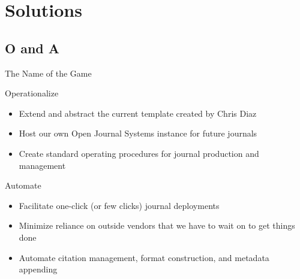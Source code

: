 \documentclass[aspectratio=169,9pt,xcolor=dvipsnames]{beamer}
\begin{document}
\section{Solutions}
\subsection{O and A}
\begin{frame}{The Name of the Game}
    \begin{block}{Operationalize}
        \begin{itemize}
            \item Extend and abstract the current template created by Chris Diaz
            \item Host our own Open Journal Systems instance for future journals
            \item Create standard operating procedures for journal production and management
        \end{itemize}
    \end{block} %
    \begin{block}{Automate}
        \begin{itemize}
            \item Facilitate one-click (or few clicks) journal deployments
            \item Minimize reliance on outside vendors that we have to wait on to get things done
            \item Automate citation management, format construction, and metadata appending
        \end{itemize}
    \end{block} %
    
\end{frame}
\end{document}
